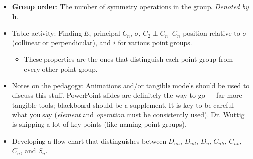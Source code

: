 \documentclass[../notes.tex]{subfiles}
\begin{document}
\begin{itemize}
    \item \textbf{Group order}: The number of symmetry operations in the group. \emph{Denoted by} $\bm{h}$.
    \item Table activity: Finding $E$, principal $C_n$, $\sigma$, $C_2\perp C_n$, $C_n$ position relative to $\sigma$ (collinear or perpendicular), and $i$ for various point groups.
    \begin{itemize}
        \item These properties are the ones that distinguish each point group from every other point group.
    \end{itemize}
    \item Notes on the pedagogy: Animations and/or tangible models should be used to discuss this stuff. PowerPoint slides are definitely the way to go --- far more tangible tools; blackboard should be a supplement. It is key to be careful what you say (\emph{element} and \emph{operation} must be consistently used). Dr. Wuttig is skipping a lot of key points (like naming point groups).
    \item Developing a flow chart that distinguishes between $D_{nh}$, $D_{nd}$, $D_n$, $C_{nh}$, $C_{nv}$, $C_n$, and $S_n$.
\end{itemize}
\end{document}

